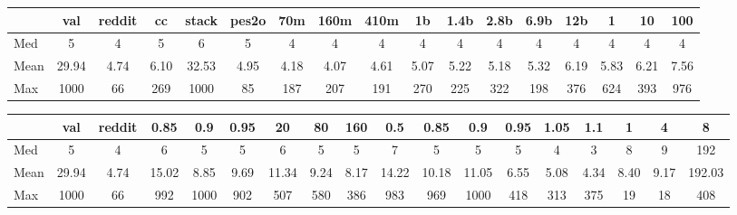 \begin{tabular}{l|cccccccccccccccc}
    \toprule
     & val & reddit & cc & stack & pes2o & 70m & 160m & 410m & 1b & 1.4b & 2.8b & 6.9b & 12b & 1 & 10 & 100 \\
    \hline
    Med & 5 & 4 & 5 & 6 & 5 & 4 & 4 & 4 & 4 & 4 & 4 & 4 & 4 & 4 & 4 & 4 \\
    Mean & 29.94 & 4.74 & 6.10 & 32.53 & 4.95 & 4.18 & 4.07 & 4.61 & 5.07 & 5.22 & 5.18 & 5.32 & 6.19 & 5.83 & 6.21 & 7.56 \\
    Max & 1000 & 66 & 269 & 1000 & 85 & 187 & 207 & 191 & 270 & 225 & 322 & 198 & 376 & 624 & 393 & 976 \\
    \bottomrule
\end{tabular}

\begin{tabular}{l|ccccccccccccccccc}
    \toprule
     & val & reddit & 0.85 & 0.9 & 0.95 & 20 & 80 & 160 & 0.5 & 0.85 & 0.9 & 0.95 & 1.05 & 1.1 & 1 & 4 & 8 \\
    \hline
    Med & 5 & 4 & 6 & 5 & 5 & 6 & 5 & 5 & 7 & 5 & 5 & 5 & 4 & 3 & 8 & 9 & 192 \\
    Mean & 29.94 & 4.74 & 15.02 & 8.85 & 9.69 & 11.34 & 9.24 & 8.17 & 14.22 & 10.18 & 11.05 & 6.55 & 5.08 & 4.34 & 8.40 & 9.17 & 192.03 \\
    Max & 1000 & 66 & 992 & 1000 & 902 & 507 & 580 & 386 & 983 & 969 & 1000 & 418 & 313 & 375 & 19 & 18 & 408 \\
    \bottomrule
\end{tabular}
